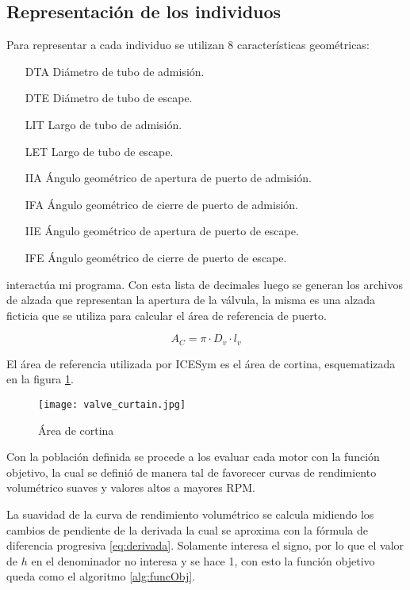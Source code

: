 \subsection{Representación de los individuos}

Para representar a cada individuo se utilizan 8 características geométricas:

\begin{enumerate}
    \item [DTA] Diámetro de tubo de admisión.
    \item [DTE] Diámetro de tubo de escape.
    \item [LIT] Largo de tubo de admisión.
    \item [LET] Largo de tubo de escape.
    \item [IIA] Ángulo geométrico de apertura de puerto de admisión.
    \item [IFA] Ángulo geométrico de cierre de puerto de admisión.
    \item [IIE] Ángulo geométrico de apertura de puerto de escape.
    \item [IFE] Ángulo geométrico de cierre de puerto de escape.
\end{enumerate}


interactúa mi programa.  Con esta lista de decimales luego se generan los
archivos de alzada que representan la apertura de la válvula, la misma es una
alzada ficticia que se utiliza para calcular el área de referencia de puerto.

\begin{equation}
  A_{C} = \pi \cdot D_{v}\cdot l_{v}
\end{equation}

El área de referencia utilizada por ICESym es el área de cortina, esquematizada
en la figura \ref{fig:area_cortina}.

\begin{figure}
  \centering
  \texttt{[image: valve\_curtain.jpg]}
  \caption{Área de cortina}
  \label{fig:area_cortina}
\end{figure}

Con la población definida se procede a los evaluar cada motor con la función
objetivo, la cual se definió de manera tal de favorecer curvas de rendimiento
volumétrico suaves y valores altos a mayores RPM.

La suavidad de la curva de rendimiento volumétrico se calcula midiendo los
cambios de pendiente de la derivada la cual se aproxima con la fórmula de
diferencia progresiva \ref{eq:derivada}.
%
Solamente interesa el signo, por lo que el valor de $h$ en el denominador no
interesa y se hace 1, con esto la función objetivo queda como el algoritmo
\ref{alg:funcObj}.

